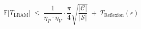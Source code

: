 \begin{equation}
\mathbb{E}\bigl[T_{\mathrm{LRAM}}\bigr] \; \leq \; \frac{1}{\eta_{P} \cdot \eta_{V}} \cdot \frac{\pi}{4} \sqrt{\frac{|\mathcal{C}|}{|\mathcal{S}|}} \; + \; T_{\mathrm{Reflexion}}(\epsilon)
\end{equation}
